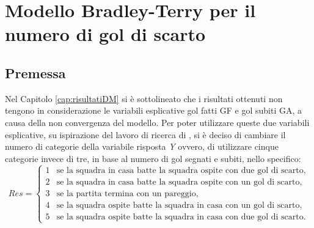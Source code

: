 
\chapter{Modello Bradley-Terry per il numero di gol di scarto }
\label{cap:extraDM}
\section{Premessa}
Nel Capitolo \ref{cap:risultatiDM} si è sottolineato che i risultati ottenuti non tengono in considerazione le variabili esplicative gol fatti \textsf{GF} e gol subiti \textsf{GA}, a causa della non convergenza del modello. Per poter utilizzare queste due variabili esplicative, su ispirazione del lavoro di ricerca di \textcite{schauberger2017}, si è deciso di cambiare il numero di categorie della variabile risposta \emph{Y} ovvero, di utilizzare cinque categorie invece di tre, in base al numero di gol segnati e subiti, nello specifico:
\begin{equation}
	Res =
	\begin{cases}
		1 & \text{se la squadra in casa batte la squadra ospite con due gol di scarto,}\\
		2 & \text{se la squadra in casa batte la squadra ospite con un gol di scarto,}\\
		3 & \text{se la partita termina con un pareggio,}\\
		4 & \text{se la squadra ospite batte la squadra in casa con un gol di scarto, }\\
		5 & \text{se la squadra ospite batte la squadra in casa con due gol di scarto.}
	\end{cases}       
\end{equation}

